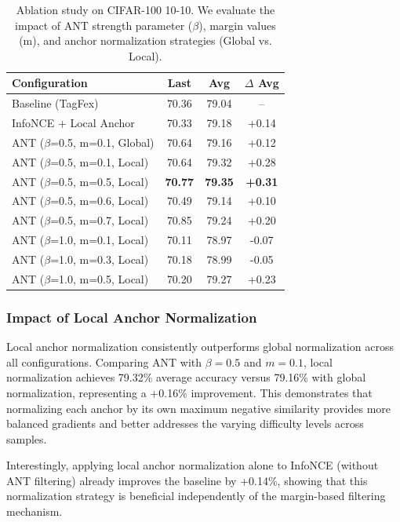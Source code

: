 \documentclass[letterpaper]{article} %
\begin{document}
\begin{table}[h]
  \centering
  \caption{Ablation study on CIFAR-100 10-10. We evaluate the impact of ANT strength parameter ($\beta$), margin values (m), and anchor normalization strategies (Global vs. Local).}
  \label{tab:ablation}
  \setlength{\tabcolsep}{4pt}
  \begin{tabular}{lccc}
    \toprule
    \textbf{Configuration} & \textbf{Last} & \textbf{Avg} & \textbf{$\Delta$ Avg} \\
    \midrule
    Baseline (TagFex)              & 70.36 & 79.04 & -- \\
    \midrule
    InfoNCE + Local Anchor         & 70.33 & 79.18 & +0.14 \\
    \midrule
    ANT ($\beta$=0.5, m=0.1, Global) & 70.64 & 79.16 & +0.12 \\
    ANT ($\beta$=0.5, m=0.1, Local)  & 70.64 & 79.32 & +0.28 \\
    ANT ($\beta$=0.5, m=0.5, Local)  & \textbf{70.77} & \textbf{79.35} & \textbf{+0.31} \\
    ANT ($\beta$=0.5, m=0.6, Local)  & 70.49 & 79.14 & +0.10 \\
    ANT ($\beta$=0.5, m=0.7, Local)  & 70.85 & 79.24 & +0.20 \\
    \midrule
    ANT ($\beta$=1.0, m=0.1, Local)  & 70.11 & 78.97 & -0.07 \\
    ANT ($\beta$=1.0, m=0.3, Local)  & 70.18 & 78.99 & -0.05 \\
    ANT ($\beta$=1.0, m=0.5, Local)  & 70.20 & 79.27 & +0.23 \\
    \bottomrule
  \end{tabular}
\end{table}

\subsubsection{Impact of Local Anchor Normalization}

Local anchor normalization consistently outperforms global normalization across all configurations. Comparing ANT with $\beta=0.5$ and $m=0.1$, local normalization achieves 79.32\% average accuracy versus 79.16\% with global normalization, representing a +0.16\% improvement. This demonstrates that normalizing each anchor by its own maximum negative similarity provides more balanced gradients and better addresses the varying difficulty levels across samples.

Interestingly, applying local anchor normalization alone to InfoNCE (without ANT filtering) already improves the baseline by +0.14\%, showing that this normalization strategy is beneficial independently of the margin-based filtering mechanism.
\end{document}
